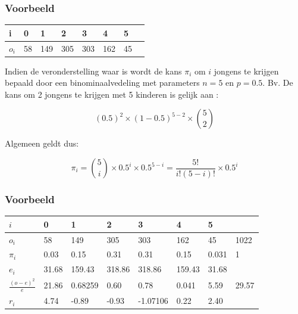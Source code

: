 \documentclass{beamer}
\begin{document}
\begin{frame}
  \frametitle{Voorbeeld}
  \begin{table}[h]
\begin{tabular}{@{}llllllll@{}}
\toprule
i       & 0  & 1   & 2   & 3   & 4   & 5  &  \\ \midrule
$o_{i}$ & 58 & 149 & 305 & 303 & 162 & 45 &  \\ \bottomrule
\end{tabular}
\end{table}
\pause
Indien de veronderstelling waar is wordt de kans $\pi_{i}$ om $i$ jongens te krijgen bepaald door een binominaalvedeling met parameters $n=5$ en $p=0.5$.
Bv. De kans om 2 jongens te krijgen met 5 kinderen is gelijk aan :

\[ (0.5)^{2} \times (1-0.5)^{5-2} \times \binom{5}{2} \]

Algemeen geldt dus:

\[ \pi_{i} = \binom{5}{i}\times 0.5^{i} \times 0.5^{5-i} = \frac{5!}{i!(5-i)!}\times 0.5^{i} \]
\end{frame}

\begin{frame}
  \frametitle{Voorbeeld}
  \begin{table}[h]
\begin{tabular}{@{}llllllll@{}}
\toprule
$i$                         & 0        & 1        & 2        & 3        & 4       & 5       &         \\ \midrule
$o_i$                      & 58       & 149      & 305      & 303      & 162     & 45      & 1022    \\
$\pi_i$                      & 0.03    & 0.15    & 0.31    & 0.31  & 0.15 & 0.031 & 1       \\
$e_i$                      & 31.68   & 159.43  & 318.86  & 318.86  & 159.43 & 31.68  &         \\
$\frac{(o-e)^{2}}{e}$ & 21.86 & 0.68259  & 0.60   & 0.78  & 0.041 & 5.59 & 29.57 \\
$r_i$                      & 4.74   & -0.89 & -0.93 & -1.07106 & 0.22 & 2.40 &         \\ \bottomrule
\end{tabular}
\end{table}
\end{frame}
\end{document}
